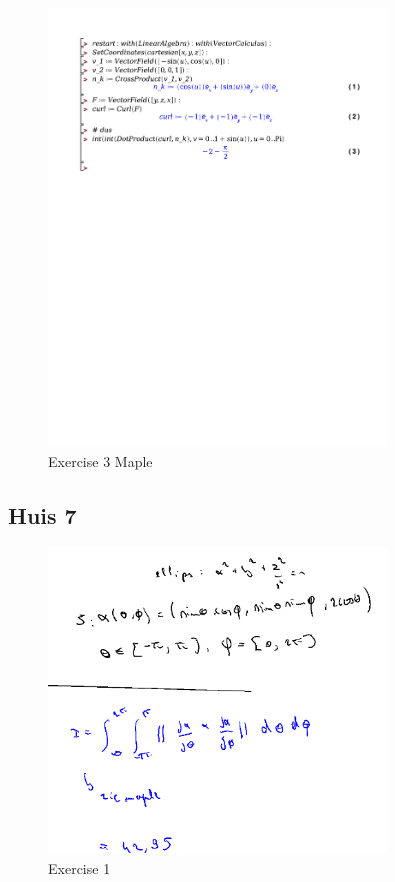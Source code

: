 \documentclass[a4paper]{report}
\begin{document}
\begin{figure}[H]
	\centering
	\includegraphics[width=0.8\textwidth]{exercises/bord_7_ex_3.pdf}
	\caption{Exercise 3 Maple}
	\label{fig:bord_7_ex_3_maple}
\end{figure}

\subsection*{Huis 7}

\begin{figure}[H]
	\centering
	\includegraphics[width=0.8\textwidth]{assets/huis_7_ex_1.png}
	\caption{Exercise 1}
	\label{fig:huis_7_ex_1}
\end{figure}
\end{document}

